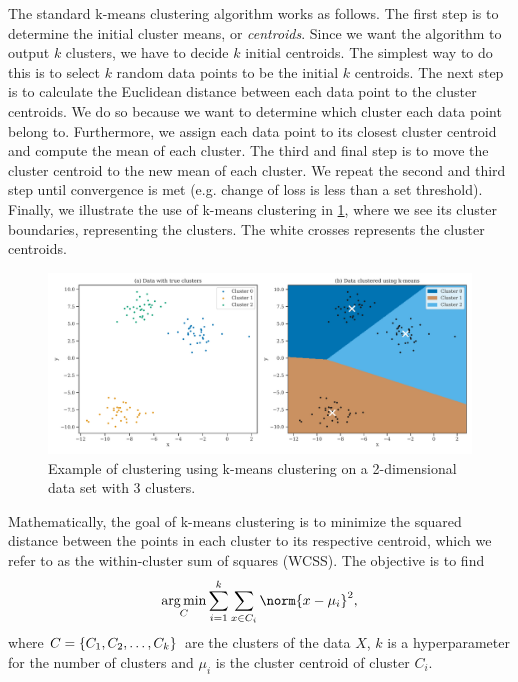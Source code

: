 The standard k-means clustering algorithm works as follows. The first step is to determine the initial cluster means, or \textit{centroids}. Since we want the algorithm to output $k$ clusters, we have to decide $k$ initial centroids. The simplest way to do this is to select $k$ random data points to be the initial $k$ centroids. The next step is to calculate the Euclidean distance between each data point to the cluster centroids. We do so because we want to determine which cluster each data point belong to. Furthermore, we assign each data point to its closest cluster centroid and compute the mean of each cluster. The third and final step is to move the cluster centroid to the new mean of each cluster. We repeat the second and third step until convergence is met (e.g. change of loss is less than a set threshold). Finally, we illustrate the use of k-means clustering in \cref{fig:k-means-clustering-2d-example}, where we see its cluster boundaries, representing the clusters. The white crosses represents the cluster centroids.
\begin{figure}[H]
    \centering
    \includegraphics[width=\textwidth]{thesis/figures/k-means-clustering-2d-example.pdf}
    \caption{Example of clustering using k-means clustering on a 2-dimensional data set with 3 clusters.}
    \label{fig:k-means-clustering-2d-example}
\end{figure}

Mathematically, the goal of k-means clustering is to minimize the squared distance between the points in each cluster to its respective centroid, which we refer to as the within-cluster sum of squares (WCSS). The objective is to find
\begin{align}
    \argmin_{C} \sumlim{i=1}{k} \sumlim{x \in C_i}{} \norm{x - \mu_i}^2,
\end{align}
where $C = \left\{C_1, C_2, \ldots, C_k\right\}$ are the clusters of the data $X$, $k$ is a hyperparameter for the number of clusters and $\mu_i$ is the cluster centroid of cluster $C_i$.

